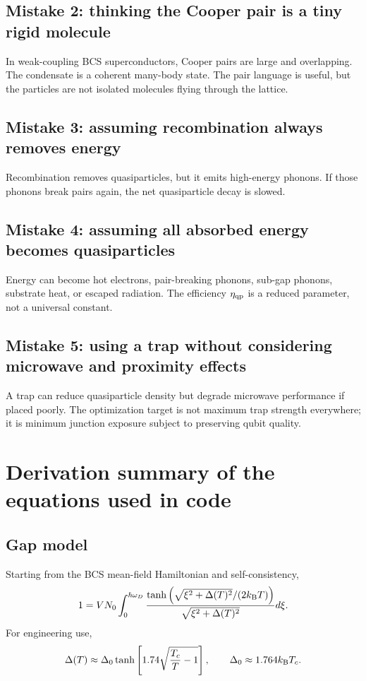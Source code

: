\documentclass[11pt]{article}
\begin{document}
\subsection{Mistake 2: thinking the Cooper pair is a tiny rigid molecule}
In weak-coupling BCS superconductors, Cooper pairs are large and overlapping. The condensate is a coherent many-body state. The pair language is useful, but the particles are not isolated molecules flying through the lattice.

\subsection{Mistake 3: assuming recombination always removes energy}
Recombination removes quasiparticles, but it emits high-energy phonons. If those phonons break pairs again, the net quasiparticle decay is slowed.

\subsection{Mistake 4: assuming all absorbed energy becomes quasiparticles}
Energy can become hot electrons, pair-breaking phonons, sub-gap phonons, substrate heat, or escaped radiation. The efficiency $\eta_{\mathrm{qp}}$ is a reduced parameter, not a universal constant.

\subsection{Mistake 5: using a trap without considering microwave and proximity effects}
A trap can reduce quasiparticle density but degrade microwave performance if placed poorly. The optimization target is not maximum trap strength everywhere; it is minimum junction exposure subject to preserving qubit quality.

\section{Derivation summary of the equations used in code}

\subsection{Gap model}
Starting from the BCS mean-field Hamiltonian and self-consistency,
\begin{equation}
1=V N_0\int_0^{\hbar\omega_D}
\frac{\tanh\left(\sqrt{\xi^2+\Delta(T)^2}/(2k_{\mathrm{B}} T)\right)}
{\sqrt{\xi^2+\Delta(T)^2}}d\xi.
\end{equation}
For engineering use,
\begin{equation}
\Delta(T)\approx\Delta_0\tanh\left[1.74\sqrt{\frac{T_c}{T}-1}\right],
\qquad \Delta_0\approx1.764k_{\mathrm{B}} T_c.
\end{equation}
\end{document}
